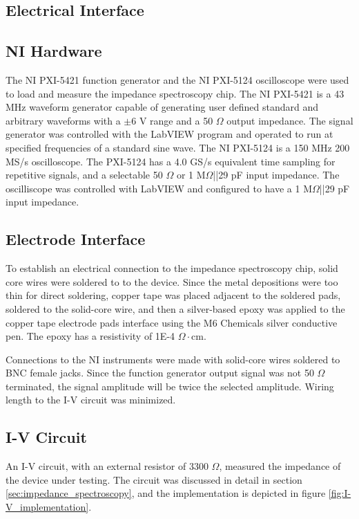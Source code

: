 \subsection{Electrical Interface}

\subsection*{NI Hardware}
\par The NI PXI-5421 function generator and the NI PXI-5124 oscilloscope were used to load and measure the impedance spectroscopy chip. The NI PXI-5421 is a 43 MHz waveform generator capable of generating user defined standard and arbitrary waveforms with a $\pm$6 V range and a 50 $\Omega$ output impedance. The signal generator was controlled with the LabVIEW program and operated to run at specified frequencies of a standard sine wave. The NI PXI-5124 is a 150 MHz 200 MS/s oscilloscope. The PXI-5124 has a 4.0 GS/s equivalent time sampling for repetitive signals, and a selectable 50 $\Omega$ or 1 M$\Omega$||29 pF input impedance. The oscilliscope was controlled with LabVIEW and configured to have a 1 M$\Omega$||29 pF input impedance.

\subsection*{Electrode Interface}
\par To establish an electrical connection to the impedance spectroscopy chip, solid core wires were soldered to to the device. Since the metal depositions were too thin for direct soldering, copper tape was placed adjacent to the soldered pads, soldered to the solid-core wire, and then a silver-based epoxy was applied to the copper tape electrode pads interface using the M6 Chemicals silver conductive pen. The epoxy has a resistivity of 1E-4 $\Omega\cdot$cm.

\par Connections to the NI instruments were made with solid-core wires soldered to BNC female jacks. Since the function generator output signal was not 50 $\Omega$ terminated, the signal amplitude will be twice the selected amplitude. Wiring length to the I-V circuit was minimized. 

\subsection*{I-V Circuit}
\par An I-V circuit, with an external resistor of 3300 $\Omega$, measured the impedance of the device under testing. The circuit was discussed in detail in section \ref{sec:impedance_spectroscopy}, and the implementation is depicted in figure \ref{fig:I-V_implementation}.

